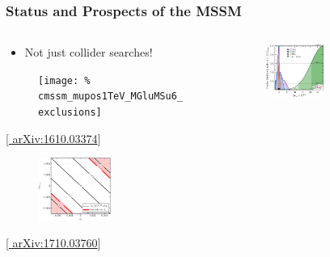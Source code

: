 \documentclass[10pt,aspectratio=169]{beamer}
\begin{document}
\begin{frame}
  \frametitle{Status and Prospects of the MSSM}
  \begin{columns}[t]
    \begin{column}{0.5\textwidth}
      \vspace{-20pt}
      \begin{itemize} \itemsep1em
      \item Not just collider searches!
      \end{itemize}
      \vspace{-15pt}
      \begin{figure}
        \hspace{-10pt}
        \texttt{[image: \%
          cmssm\_mupos1TeV\_MGluMSu6\_exclusions]}
      \end{figure}
      \vspace{-27pt}
      \begin{center}
        { \tiny [\href{http://arxiv.org/abs/arXiv:1610.03374}{%
              arXiv:1610.03374}] }
      \end{center}
      \vspace{-15pt}
      \begin{figure}
        \hspace{-15pt}
        \includegraphics[width=0.5\textwidth]{contour_de_PhiMuM12}
      \end{figure}
      \vspace{-25pt}
      \begin{center}
        { \tiny [\href{http://arxiv.org/abs/arXiv:1710.03760}{%
              arXiv:1710.03760}] }
      \end{center}
    \end{column}
    \begin{column}{0.5\textwidth}
      \vspace{-20pt}
      \begin{figure}
        \hspace{-50pt}
        \includegraphics[width=0.5\textwidth]{gambit_gut_amu}

\end{figure}
\end{column}
\end{columns}
\end{frame}
\end{document}
